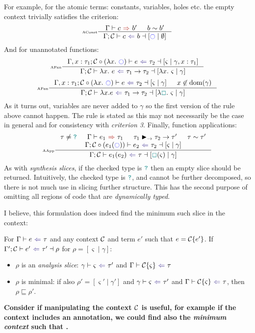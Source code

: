For example, for the atomic terms: constants, variables, holes etc. the empty context trivially satisfies the criterion:
\[\inference[\tiny AConst]{\synthesis{c}{b'} & b \sim b'}{\analysisslice{\C}{c}{b}{[\mark\mid \emptyset]}}\]
And for unannotated functions:
\[\inference[\tiny AFun]{\analysisslice[\Gamma, x:\tau_1]{\C\circ(\lambda x.\ \mark)}{e}{\tau_2}{[\varsigma\mid \gamma, x : \tau_1]}}{\analysisslice{\C}{\lambda x.\ e}{\tau_1 \to \tau_2}{[\lambda x.\ \varsigma\mid \gamma]}}\]
\[\inference[\tiny AFun]{\analysisslice[\Gamma, x:\tau_1]{\C\circ(\lambda x.\ \mark)}{e}{\tau_2}{[\varsigma\mid \gamma]} & x \not \in \mathrm{dom}(\gamma)}{\analysisslice{\C}{\lambda x.e}{\tau_1 \to \tau_2}{[\lambda \gap.\ \varsigma\mid \gamma]}}\]
As it turns out, variables are never added to $\gamma$ so the first version of the rule above cannot happen. The rule is stated as this may not necessarily be the case in general and for consistency with \textit{criterion 3}. Finally, function applications:
\[\inference[\tiny AApp]{\tau \neq \dyn &\synthesis{e_1}{\tau_1} & \tau_1 \funmatch \tau_2 \to \tau' & \tau \sim \tau'\\ \analysisslice{\C\circ (e_1(\mark))}{e_2}{\tau_2}{[\varsigma \mid \gamma]}}{\analysisslice{\C}{e_1(e_2)}{\tau}{[\gap(\varsigma)\mid \gamma]}}\]
As with \textit{synthesis slices}, if the checked type is ${\color{teal}\texttt{?}}$ then an empty slice should be returned. Intuitively, the checked type is ${\color{teal}\texttt{?}}$, and cannot be further decomposed, so there is not much use in slicing further structure. This has the second purpose of omitting all regions of code that are \textit{dynamically typed}.

I believe, this formulation does indeed find the minimum such slice in the context:
\begin{conjecture}[Correctness]
For $\analysis{e}{\tau}$ and any context $\mathcal{C}$ and term $e'$ such that $e = \mathcal{C}\{e'\}$. If $\analysisslice[\Gamma']{\C}{e'}{\tau'}{\rho}$ for $\rho = [\varsigma\mid \gamma]$:
\begin{itemize}
\item $\rho$ is an \textit{analysis slice}: $\analysis[\gamma]{\varsigma}{\tau'}$ and $\analysis{\C\{\varsigma\}}{\tau}$
\item $\rho$ is minimal: if also $\rho' = [\varsigma' \mid \gamma']$ and $\analysis[\gamma]{\varsigma}{\tau'}$ and $\analysis{\C\{\varsigma\}}{\tau}$, then $\rho \sqsubseteq \rho'$.
\end{itemize}
\end{conjecture}

\textbf{Consider if manipulating the context $\mathcal{C}$ is useful, for example if the context includes an annotation, we could find also the \textit{minimum context} such that .}

